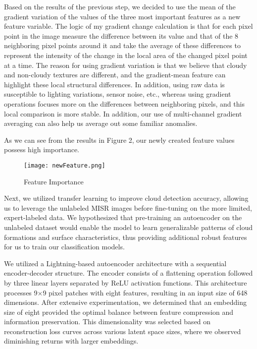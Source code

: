 \documentclass[10pt,letterpaper]{article}
\begin{document}
Based on the results of the previous step, we decided to use the mean of the gradient variation of the values of the three most important features as a new feature variable. The logic of my gradient change calculation is that for each pixel point in the image measure the difference between its value and that of the 8 neighboring pixel points around it and take the average of these differences to represent the intensity of the change in the local area of the changed pixel point at a time. The reason for using gradient variation is that we believe that cloudy and non-cloudy textures are different, and the gradient-mean feature can highlight these local structural differences. In addition, using raw data is susceptible to lighting variations, sensor noise, etc., whereas using gradient operations focuses more on the differences between neighboring pixels, and this local comparison is more stable. In addition, our use of multi-channel gradient averaging can also help us average out some familiar anomalies.

As we can see from the results in Figure 2, our newly created feature values possess high importance.

\begin{figure}[H]
    \centering
    \texttt{[image: newFeature.png]}
    \caption{Feature Importance}
    \label{fig:enter-label}
\end{figure}

Next, we utilized transfer learning to improve cloud detection accuracy, allowing us to leverage the unlabeled MISR images before fine-tuning on the more limited, expert-labeled data. We hypothesized that pre-training an autoencoder on the unlabeled dataset would enable the model to learn generalizable patterns of cloud formations and surface characteristics, thus providing additional robust features for us to train our classification models.


We utilized a Lightning-based autoencoder architecture with a sequential encoder-decoder structure. The encoder consists of a flattening operation followed by three linear layers separated by ReLU activation functions. This architecture processes 9×9 pixel patches with eight features, resulting in an input size of 648 dimensions. After extensive experimentation, we determined that an embedding size of eight provided the optimal balance between feature compression and information preservation. This dimensionality was selected based on reconstruction loss curves across various latent space sizes, where we observed diminishing returns with larger embeddings.
\end{document}
